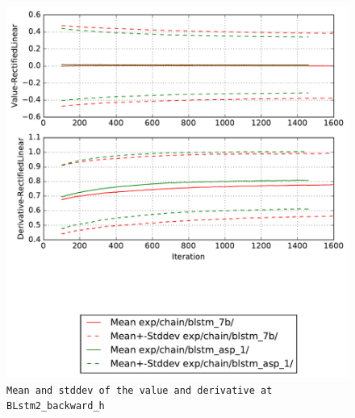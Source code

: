 \documentclass[prl,10pt,twocolumn]{revtex4}
\begin{document}
\newpage
\begin{figure}[h]
  \begin{center}
    \caption{\texttt{Mean and stddev of the value and derivative at BLstm2\_backward\_h}}
    \includegraphics[width=\textwidth]{exp/chain/blstm_7b/report/nonlinstats_BLstm2_backward_h.pdf}
  \end{center}
\end{figure}
\clearpage
\end{document}
